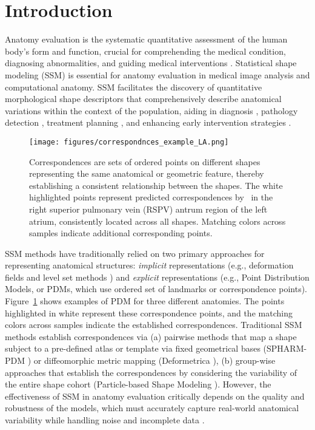 
\section{Introduction} \label{introduction}
Anatomy evaluation is the systematic quantitative assessment of the human body's form and function, crucial for comprehending the medical condition, diagnosing abnormalities, and guiding medical interventions \cite{singh2020evaluation,dai2020statistical,zhang20243dcmm,quiceno2024statistical}. Statistical shape modeling (SSM) is essential for anatomy evaluation in medical image analysis and computational anatomy. SSM facilitates the discovery of quantitative morphological shape descriptors that comprehensively describe anatomical variations within the context of the population, aiding in diagnosis \cite{khan2022machine,schaufelberger2022radiation}, pathology detection \cite{peiffer2022statistical,sophocleous2022feasibility}, treatment planning \cite{vicory2022statistical}, and enhancing early intervention strategies \cite{merle2019high,mulder2022dynamic,okegbile2022human}.

\begin{figure}
    \centering
    \texttt{[image: figures/correspondnces\_example\_LA.png]}
    \caption{Correspondences are sets of ordered points on different shapes representing the same anatomical or geometric feature, thereby establishing a consistent relationship between the shapes. The white highlighted points represent predicted correspondences by \model~in the right superior pulmonary vein (RSPV) antrum region of the left atrium, consistently located across all shapes. Matching colors across samples indicate additional corresponding points. }
    \label{fig:correspondences_example}
    \vspace{-8mm}
\end{figure}

SSM methods have traditionally relied on two primary approaches for representing anatomical structures: \textit{implicit} representations (e.g., deformation fields \cite{durrleman2014morphometry} and level set methods \cite{samson2000level}) and \textit{explicit} representations (e.g., Point Distribution Models, or PDMs, which use ordered set of landmarks or correspondence points). Figure~\ref{fig:correspondences_example} shows examples of PDM for three different anatomies. The points highlighted in white represent these correspondence points, and the matching colors across samples indicate the established correspondences. Traditional SSM methods establish correspondences via (a) pairwise methods that map a shape subject to a pre-defined atlas or template via fixed geometrical bases (SPHARM-PDM \cite{styner2006framework}) or diffeomorphic metric mapping (Deformetrica \cite{durrleman2009statistical}), (b) group-wise approaches that establish the correspondences by considering the variability of the entire shape cohort (Particle-based Shape Modeling \cite{cates2007shape,cates2008particle}). 
However, the effectiveness of SSM in anatomy evaluation critically depends on the quality and robustness of the models, which must accurately capture real-world anatomical variability while handling noise and incomplete data \cite{cerrolaza2019computational}.

